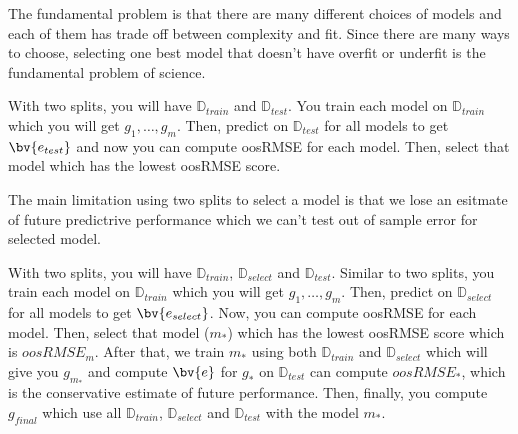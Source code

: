 \documentclass[12pt]{article}
\begin{document}
\begin{enumerate}


The fundamental problem is that there are many different choices of models and each of them has trade off between complexity and fit. Since there are many ways to choose, selecting one best model that doesn't have overfit or underfit is the fundamental problem of science.


With two splits, you will have $\mathbb{D}_{train}$ and $\mathbb{D}_{test}$. You train each model on $\mathbb{D}_{train}$ which you will get $g_1, \dots, g_m$. Then, predict on $\mathbb{D}_{test}$ for all models to get $\bv{e_{test}}$ and now you can compute oosRMSE for each model. Then, select that model which has the lowest oosRMSE score.


The main limitation using two splits to select a model is that we lose an esitmate of future predictrive performance which we can't test out of sample error for selected model. 


With two splits, you will have $\mathbb{D}_{train}$, $\mathbb{D}_{select}$ and $\mathbb{D}_{test}$. Similar to two splits, you train each model on $\mathbb{D}_{train}$ which you will get $g_1, \dots, g_m$. Then, predict on $\mathbb{D}_{select}$ for all models to get $\bv{e_{select}}$. Now, you can compute oosRMSE for each model. Then, select that model ($m_*$) which has the lowest oosRMSE score which is $oosRMSE_m$. After that, we train $m_*$ using both $\mathbb{D}_{train}$ and $\mathbb{D}_{select}$ which will give you $g_{m_*}$ and compute $\bv{e}$ for $g_*$ on $\mathbb{D}_{test}$ can compute $oosRMSE_*$, which is the conservative estimate of future performance. Then, finally, you compute $g_{final}$ which use all $\mathbb{D}_{train}$, $\mathbb{D}_{select}$ and $\mathbb{D}_{test}$ with the model $m_*$.



\end{enumerate}
\end{document}
